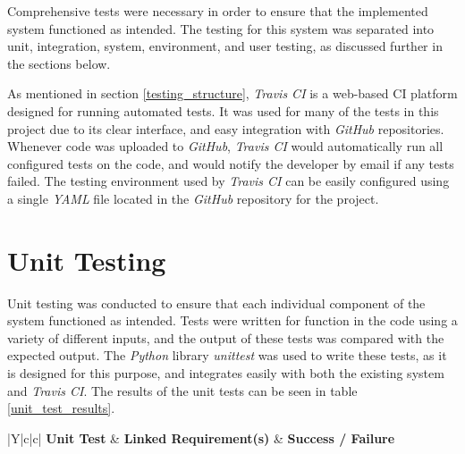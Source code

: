 %
%

Comprehensive tests were necessary in order to ensure that the implemented system functioned as intended.
The testing for this system was separated into unit, integration, system, environment, and user testing, as discussed further in the sections below.

As mentioned in section \ref{testing_structure}, \textit{Travis CI} \cite{travis_ci} is a web-based CI platform designed for running automated tests.
It was used for many of the tests in this project due to its clear interface, and easy integration with \textit{GitHub} repositories.
Whenever code was uploaded to \textit{GitHub}, \textit{Travis CI} would automatically run all configured tests on the code, and would notify the developer by email if any tests failed.
The testing environment used by \textit{Travis CI} can be easily configured using a single \textit{YAML} \cite{yaml} file located in the \textit{GitHub} repository for the project.



\section{Unit Testing}
\label{unit_testing}
Unit testing was conducted to ensure that each individual component of the system functioned as intended.
Tests were written for function in the code using a variety of different inputs, and the output of these tests was compared with the expected output.
The \textit{Python} library \textit{unittest} \cite{python_unittests} was used to write these tests, as it is designed for this purpose, and integrates easily with both the existing system and \textit{Travis CI}.
The results of the unit tests can be seen in table \ref{unit_test_results}.

\begin{table}[t]
  \caption{Results of Unit Tests}
  \begin{center}
    \begin{tabularx}{\textwidth}{|Y|c|c|} \hline
      \textbf{Unit Test} & \textbf{Linked Requirement(s)} & \textbf{Success / Failure} \\ \thickhline

    \end{tabularx}
  \end{center}
  \label{unit_test_results}
\end{table}

